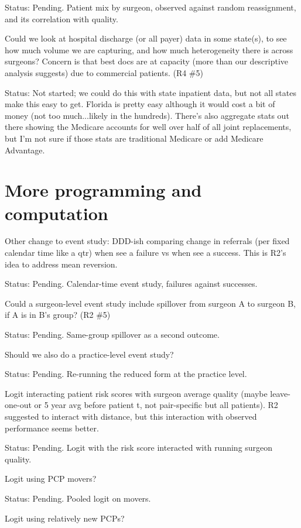 \documentclass[11pt]{article}
\newcommand{\status}[1]{\par\noindent Status: #1\par\medskip\noindent{\color{gray!40}\hrulefill}\par\medskip}
\begin{document}
\status{Pending. Patient mix by surgeon, observed against random reassignment, and its correlation with quality.}

Could we look at hospital discharge (or all payer) data in some state(s), to see how much volume we are capturing, and how much heterogeneity there is across surgeons? Concern is that best docs are at capacity (more than our descriptive analysis suggests) due to commercial patients. (R4 \#5)

\status{Not started; we could do this with state inpatient data, but not all states make this easy to get. Florida is pretty easy although it would cost a bit of money (not too much...likely in the hundreds). There's also aggregate stats out there showing the Medicare accounts for well over half of all joint replacements, but I'm not sure if those stats are traditional Medicare or add Medicare Advantage.}

\section{More programming and computation}

Other change to event study: DDD-ish comparing change in referrals (per fixed calendar time like a qtr) when see a failure vs when see a success. This is R2's idea to address mean reversion.

\status{Pending. Calendar-time event study, failures against successes.}

Could a surgeon-level event study include spillover from surgeon A to surgeon B, if A is in B's group? (R2 \#5)

\status{Pending. Same-group spillover as a second outcome.}

Should we also do a practice-level event study?

\status{Pending. Re-running the reduced form at the practice level.}

Logit interacting patient risk scores with surgeon average quality (maybe leave-one-out or 5 year avg before patient t, not pair-specific but all patients). R2 suggested to interact with distance, but this interaction with observed performance seems better.

\status{Pending. Logit with the risk score interacted with running surgeon quality.}

Logit using PCP movers?

\status{Pending. Pooled logit on movers.}

Logit using relatively new PCPs?
\end{document}
